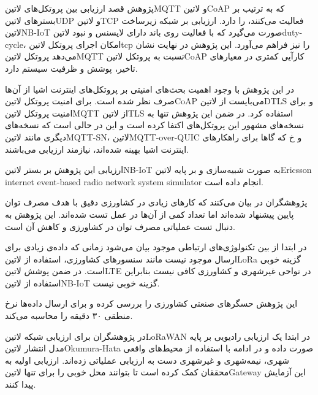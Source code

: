 
پژوهش  قصد ارزیابی بین پروتکل‌های ‌لاتین{MQTT} و ‌لاتین{CoAP} که به ترتیب بر بسترهای ‌لاتین{UDP} و ‌لاتین{TCP} فعالیت می‌کنند، را دارد.
ارزیابی بر شبکه زیرساخت ‌لاتین{NB-IoT} صورت می‌گیرد که با فعالیت روی باند دارای لایسنس و نبود ‌لاتین{duty-cycle}، امکان اجرای پروتکل ‌لاتین{tcp} را نیز فراهم می‌آورد.
این پژوهش در نهایت نشان می‌دهد پروتکل ‌لاتین{MQTT} نسبت به پروتکل ‌لاتین{CoAP} کارآیی کمتری در معیارهای تاخیر، پوشش و ظرفیت سیستم دارد.

در این پژوهش با وجود اهمیت بحث‌های امنیتی بر پروتکل‌های اینترنت اشیا از آن‌ها صرف نظر شده است. برای امنیت پروتکل ‌لاتین{CoAP} می‌بایست از ‌لاتین{DTLS} و
برای امنیت پروتکل ‌لاتین{MQTT} از ‌لاتین{TLS} استفاده کرد.
در ضمن این پژوهش تنها به نسخه‌های مشهور این پروتکل‌های اکتفا کرده است و این در حالی است که نسخه‌های دیگری مانند ‌لاتین{MQTT-SN}، ‌لاتین{MQTT-over-QUIC} و ‌خ
که گاها برای راهکارهای اینترنت اشیا بهینه شده‌اند، نیازمند ارزیابی می‌باشند.

ارزیابی این پژوهش بر بستر ‌لاتین{NB-IoT} به صورت شبیه‌سازی و بر پایه ‌لاتین{Ericsson internet event-based radio network system simulator} انجام داده است.


پژوهشگران در  بیان می‌کنند که کارهای زیادی در کشاورزی دقیق با هدف مصرف توان پایین پیشنهاد شده‌اند اما تعداد کمی از آن‌ها در عمل تست شده‌اند.
این پژوهش به دنبال تست عملیاتی مصرف توان در کشاورزی و کاهش آن است.

در ابتدا از بین تکنولوژی‌های ارتباطی موجود بیان می‌شود زمانی که داده‌ی زیادی برای ارسال موجود نیست مانند سنسورهای کشاورزی، استفاده از ‌لاتین{LoRa} گزینه خوبی است.
در ضمن پوشش ‌لاتین{LTE} در نواحی غیرشهری و کشاورزی کافی نیست بنابراین استفاده از ‌لاتین{NB-IoT} گزینه خوبی نیست.

این پژوهش حسگرهای صنعتی کشاورزی را بررسی کرده و برای ارسال داده‌ها نرخ منطقی ۳۰ دقیقه را محاسبه می‌کند.


در  پژوهشگران برای ارزیابی شبکه ‌لاتین{LoRaWAN} در ابتدا یک ارزیابی رادیویی بر پایه مدل انتشار ‌لاتین{Okumura-Hata} صورت داده
و در ادامه با استفاده از محیط‌های واقعی شهری، نیمه‌شهری و غیرشهری دست به ارزیابی عملیاتی زده‌اند. ارزیابی اولیه به محققان کمک کرده است تا بتوانند محل خوبی را برای
تنها ‌لاتین{Gateway} این آزمایش پیدا کنند.

